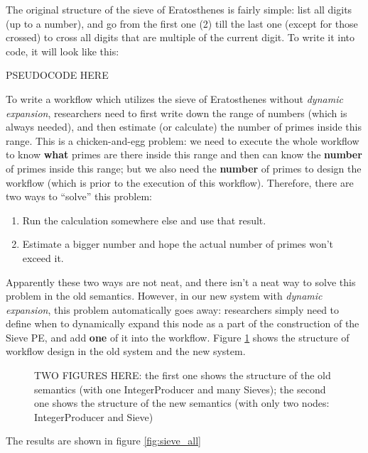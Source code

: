 \documentclass[msc,cs,logo]{infthesis}
\begin{document}
	The original structure of the sieve of Eratosthenes is fairly simple: list all digits (up to a number), and go from the first one (2) till the last one (except for those crossed) to cross all digits that are multiple of the current digit. To write it into code, it will look like this:
	
	PSEUDOCODE HERE
	
	To write a workflow which utilizes the sieve of Eratosthenes without \textit{dynamic expansion},  researchers need to first write down the range of numbers (which is always needed), and then estimate (or calculate) the number of primes inside this range. This is a chicken-and-egg problem: we need to execute the whole workflow to know \textbf{what} primes are there inside this range and then can know the \textbf{number} of primes inside this range; but we also need the \textbf{number} of primes to design the workflow (which is prior to the execution of this workflow). Therefore, there are two ways to ``solve'' this problem:
	\begin{enumerate}
		\item Run the calculation somewhere else and use that result.
		\item Estimate a bigger number and hope the actual number of primes won't exceed it.
	\end{enumerate}
	
	Apparently these two ways are not neat, and there isn't a neat way to solve this problem in the old semantics. However, in our new system with \textit{dynamic expansion}, this problem automatically goes away: researchers simply need to define when to dynamically expand this node as a part of the construction of the Sieve PE, and add \textbf{one} of it into the workflow. Figure \ref{fig:comp_old_new_sieve} shows the structure of workflow design in the old system and the new system.
	
	\begin{figure}[h]
	
	TWO FIGURES HERE:
	the first one shows the structure of the old semantics (with one IntegerProducer and many Sieves);
		the second one shows the structure of the new semantics (with only two nodes: IntegerProducer and Sieve)
		\label{fig:comp_old_new_sieve}
	\end{figure}
	
	The results are shown in figure \ref{fig:sieve_all}
	
\end{document}
